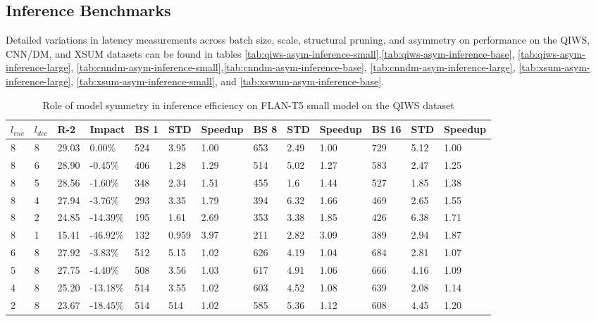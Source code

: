 \subsection{Inference Benchmarks}
\label{sec:inference-benchmarks}
Detailed variations in latency measurements across batch size, scale, structural pruning, and asymmetry on performance on the QIWS, CNN/DM, and XSUM datasets can be found in tables \ref{tab:qiws-asym-inference-small},\ref{tab:qiws-asym-inference-base}, \ref{tab:qiws-asym-inference-large}, \ref{tab:cnndm-asym-inference-small},\ref{tab:cnndm-asym-inference-base}, \ref{tab:cnndm-asym-inference-large}, \ref{tab:xsum-asym-inference-large}, \ref{tab:xsum-asym-inference-small}, and  \ref{tab:xswum-asym-inference-base}.
\begin{table*}[!ht]
    \centering
    \caption{Role of model symmetry in inference efficiency on FLAN-T5 small model on the QIWS dataset}
    \small
    \begin{tabular}{|l|l|l|l|l|l|l|l|l|l|l|l|l|}
    \hline
         $l_{enc}$ & $l_{dec}$ & R-2 & Impact & BS 1 & STD & Speedup & BS 8 & STD  & Speedup & BS 16 & STD & Speedup \\ \hline
         8 & 8 & 29.03 & 0.00\% & 524 & 3.95 & 1.00 & 653 & 2.49 & 1.00 & 729 & 5.12 & 1.00 \\ \hline
        8 & 6 & 28.90 & -0.45\% & 406 & 1.28 & 1.29 & 514 & 5.02 & 1.27 & 583 & 2.47 & 1.25 \\ \hline
        8 & 5 & 28.56 & -1.60\% & 348 & 2.34 & 1.51 & 455 & 1.6 & 1.44 & 527 & 1.85 & 1.38 \\ \hline
        8 & 4 & 27.94 & -3.76\% & 293 & 3.35 & 1.79 & 394 & 6.32 & 1.66 & 469 & 2.65 & 1.55 \\ \hline
        8 & 2 & 24.85 & -14.39\% & 195 & 1.61 & 2.69 & 353 & 3.38 & 1.85 & 426 & 6.38 & 1.71 \\ \hline
        8 & 1 & 15.41 & -46.92\% & 132 & 0.959 & 3.97 & 211 & 2.82 & 3.09 & 389 & 2.94 & 1.87 \\ \hline
        6 & 8 & 27.92 & -3.83\% & 512 & 5.15 & 1.02 & 626 & 4.19 & 1.04 & 684 & 2.81 & 1.07 \\ \hline
        5 & 8 & 27.75 & -4.40\% & 508 & 3.56 & 1.03 & 617 & 4.91 & 1.06 & 666 & 4.16 & 1.09 \\ \hline
        4 & 8 & 25.20 & -13.18\% & 514 & 3.55 & 1.02 & 603 & 4.52 & 1.08 & 639 & 2.08 & 1.14 \\ \hline
        2 & 8 & 23.67 & -18.45\% & 514 & 514 & 1.02 & 585 & 5.36 & 1.12 & 608 & 4.45 & 1.20 \\ \hline

\end{tabular}
\end{table*}
